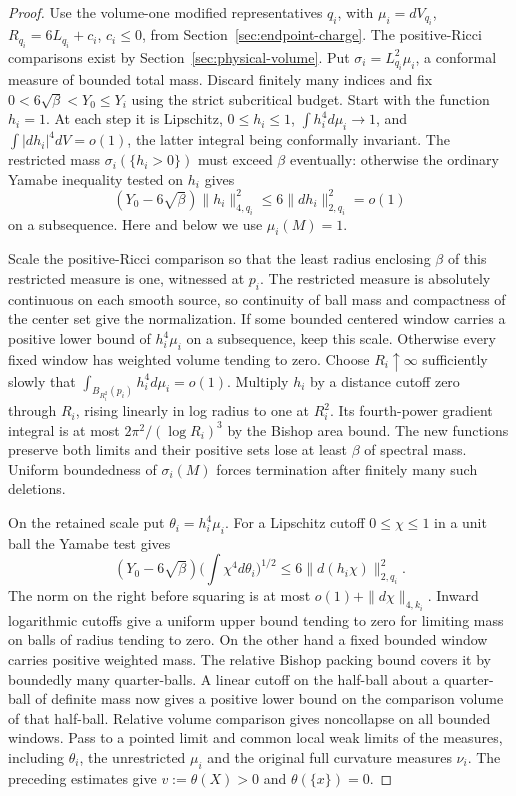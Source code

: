 \begin{proof}
Use the volume-one modified representatives \(q_i\), with
\(\mu_i=dV_{q_i}\), \(R_{q_i}=6L_{q_i}+c_i\), \(c_i\le0\),
from Section~\ref{sec:endpoint-charge}. The positive-Ricci comparisons
exist by Section~\ref{sec:physical-volume}. Put
\(\sigma_i=L_{q_i}^2\mu_i\), a conformal measure of bounded total
mass. Discard finitely many indices and fix
\(0<6\sqrt\beta<Y_0\le Y_i\) using the strict subcritical budget.
Start with the function \(h_i=1\). At each step it is Lipschitz,
\(0\le h_i\le1\), \(\int h_i^4d\mu_i\to1\), and
\(\int|dh_i|^4dV=o(1)\), the latter integral being conformally
invariant. The restricted mass \(\sigma_i(\{h_i>0\})\) must
exceed \(\beta\) eventually: otherwise the ordinary Yamabe
inequality tested on \(h_i\) gives
\[
 (Y_0-6\sqrt\beta)\|h_i\|_{4,q_i}^2
   \le 6\|dh_i\|_{2,q_i}^2=o(1)
\]
on a subsequence. Here and below we use \(\mu_i(M)=1\).

Scale the positive-Ricci comparison so that the least radius
enclosing \(\beta\) of this restricted measure is one, witnessed
at \(p_i\). The restricted measure is absolutely continuous on
each smooth source, so continuity of ball mass and compactness of
the center set give the normalization. If some bounded centered
window carries a positive lower bound of \(h_i^4\mu_i\) on a
subsequence, keep this scale. Otherwise every fixed window has
weighted volume tending to zero. Choose \(R_i\uparrow\infty\)
sufficiently slowly that \(\int_{B_{R_i^2}(p_i)}h_i^4d\mu_i=o(1)\).
Multiply \(h_i\) by a distance cutoff zero through \(R_i\), rising
linearly in log radius to one at \(R_i^2\). Its fourth-power
gradient integral is at most \(2\pi^2/(\log R_i)^3\) by the
Bishop area bound. The new functions preserve both limits and
their positive sets lose at least \(\beta\) of spectral mass.
Uniform boundedness of \(\sigma_i(M)\) forces termination after
finitely many such deletions.

On the retained scale put \(\theta_i=h_i^4\mu_i\). For a Lipschitz
cutoff \(0\le\chi\le1\) in a unit ball the Yamabe test gives
\[
 (Y_0-6\sqrt\beta)\Big(\int\chi^4d\theta_i\Big)^{1/2}
       \le6\|d(h_i\chi)\|_{2,q_i}^2 .
\]
The norm on the right before squaring is at most
\(o(1)+\|d\chi\|_{4,k_i}\). Inward logarithmic cutoffs give
a uniform upper bound tending to zero for limiting mass on balls
of radius tending to zero. On the other hand a fixed bounded
window carries positive weighted mass. The relative Bishop packing
bound covers it by boundedly many quarter-balls. A linear cutoff on
the half-ball about a quarter-ball of definite mass now gives a
positive lower bound on the comparison volume of that half-ball.
Relative volume comparison gives noncollapse on all bounded
windows. Pass to a pointed limit and common local weak limits of
the measures, including \(\theta_i\), the unrestricted \(\mu_i\)
and the original full curvature measures \(\nu_i\). The preceding
estimates give \(v:=\theta(X)>0\) and \(\theta(\{x\})=0\).


\end{proof}
